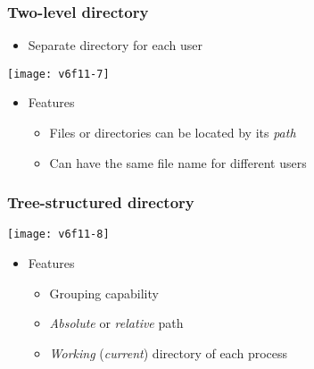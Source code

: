 \documentclass[CJKutf8,xcolor=pdftex,dvipsnames,table]{beamer}
\begin{document}
\begin{CJK*}{UTF8}{song}
  \begin{frame}
    \frametitle{Two-level directory} \pause
    \begin{itemize}
    \item Separate directory for each user \pause
    \end{itemize}
    \begin{center}
      \texttt{[image: v6f11-7]} \pause
    \end{center}
    \begin{itemize}
    \item Features \pause
      \begin{itemize}
      \item Files or directories can be located by its \emph{path} \pause
      \item Can have the same file name for different users
      \end{itemize}
    \end{itemize}
  \end{frame}

  \begin{frame}
    \frametitle{Tree-structured directory} \pause
    \begin{center}
      \texttt{[image: v6f11-8]} \pause
    \end{center}
    \begin{itemize}\parskip=0pt
    \item Features \pause
      \begin{itemize}\parskip=0pt
      \item Grouping capability \pause
      \item \emph{Absolute} or \emph{relative} path \pause
      \item \emph{Working} (\emph{current}) directory of each process
      \end{itemize}
    \end{itemize}
  \end{frame}


\end{CJK*}
\end{document}
